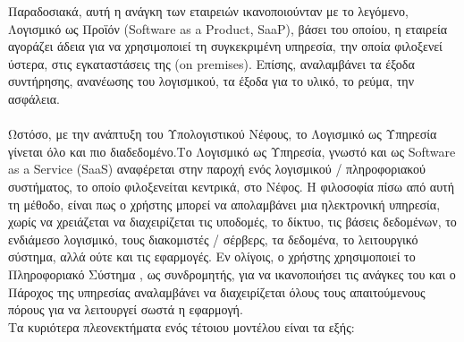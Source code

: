 \documentclass{article}
\begin{document}
Παραδοσιακά, αυτή η ανάγκη των εταιρειών ικανοποιούνταν με το λεγόμενο, Λογισμικό ως Προϊόν (Software as a Product, SaaP), βάσει του οποίου, η εταιρεία αγοράζει άδεια για να χρησιμοποιεί τη συγκεκριμένη υπηρεσία, την οποία φιλοξενεί ύστερα, στις εγκαταστάσεις της (on premises). Επίσης, αναλαμβάνει τα έξοδα συντήρησης, ανανέωσης του λογισμικού, τα έξοδα για το υλικό, το ρεύμα, την ασφάλεια. \\ \\
Ωστόσο, με την ανάπτυξη του Υπολογιστικού Νέφους, το Λογισμικό ως Υπηρεσία γίνεται όλο και πιο διαδεδομένο.Το Λογισμικό ως Υπηρεσία, γνωστό και ως Software as a Service (SaaS) αναφέρεται στην παροχή ενός λογισμικού / πληροφοριακού συστήματος, το οποίο φιλοξενείται κεντρικά, στο Νέφος. Η φιλοσοφία πίσω από αυτή τη μέθοδο, είναι πως ο χρήστης μπορεί να απολαμβάνει μια ηλεκτρονική υπηρεσία, χωρίς να χρειάζεται να διαχειρίζεται τις υποδομές, το δίκτυο, τις βάσεις δεδομένων, το ενδιάμεσο λογισμικό, τους διακομιστές / σέρβερς, τα δεδομένα, το λειτουργικό σύστημα, αλλά ούτε και τις εφαρμογές. Εν ολίγοις, ο χρήστης χρησιμοποιεί το Πληροφοριακό Σύστημα , ως συνδρομητής, για να ικανοποιήσει τις ανάγκες του και ο Πάροχος της υπηρεσίας αναλαμβάνει να διαχειρίζεται όλους τους απαιτούμενους πόρους για να λειτουργεί σωστά η εφαρμογή.  \\ 
Τα κυριότερα πλεονεκτήματα ενός τέτοιου μοντέλου είναι τα εξής:
\end{document}
